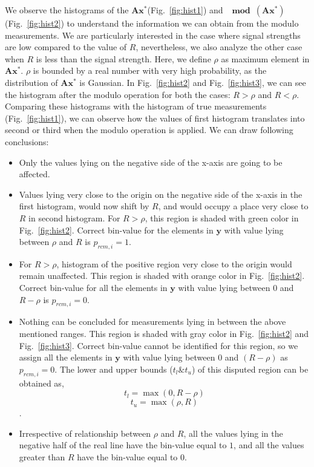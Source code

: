 We observe the histograms of the $\mathbf{Ax^*}$(Fig.~\ref{fig:hist1}) and $\mathbf{\mod(\mathbf{Ax^*})}$(Fig.~\ref{fig:hist2}) to understand the information we can obtain from the modulo measurements. We are particularly interested in the case where signal strengths are low compared to the value of $R$, nevertheless, we also analyze the other case when $R$ is less than the signal strength. Here, we define $\rho$ as maximum element in $\mathbf{Ax^*}$. $\rho$ is bounded by a real number with very high probability, as the distribution of $\mathbf{Ax^*}$ is Gaussian.
In Fig.~\ref{fig:hist2} and Fig.~\ref{fig:hist3}, we can see the histogram after the modulo operation for both the cases: $R>\rho$ and $R<\rho$. Comparing these histograms with the histogram of true measurements (Fig.~\ref{fig:hist1}), we can observe how the values of first histogram translates into second or third when the modulo operation is applied. We can draw following conclusions:
\begin{itemize}
	\item Only the values lying on the negative side of the x-axis are going to be affected.
	\item Values lying very close to the origin on the negative side of the x-axis in the first histogram, would now shift by $R$, and would occupy a place very close to $R$ in second histogram. For $R>\rho$, this region is shaded with green color in Fig.~\ref{fig:hist2}. Correct bin-value for the elements in $\mathbf{y}$ with value lying between $\rho$ and $R$ is $p_{rcm,i} = 1$.
	\item For $R>\rho$, histogram of the positive region very close to the origin would remain unaffected. This region is shaded with orange color in Fig.~\ref{fig:hist2}. Correct bin-value for all the elements in $\mathbf{y}$ with value lying between $0$ and $R-\rho$ is $p_{rcm,i} = 0$.
	\item Nothing can be concluded for measurements lying in between the above mentioned ranges. This region is shaded with gray color in Fig.~\ref{fig:hist2} and Fig.~\ref{fig:hist3}. Correct bin-value cannot be identified for this region, so we assign all the elements in $\mathbf{y}$ with value lying between $0$ and $(R-\rho)$ as $p_{rcm,i} = 0$. The lower and upper bounds ($t_l \& t_u$) of this disputed region can be obtained as, 
	$$t_l = \max(0, R-\rho)$$
	$$t_u = \max(\rho, R)$$.
	\item Irrespective of relationship between $\rho$ and $R$, all the values lying in the negative half of the real line have the bin-value equal to $1$, and all the values greater than $R$ have the bin-value equal to $0$.
\end{itemize}

